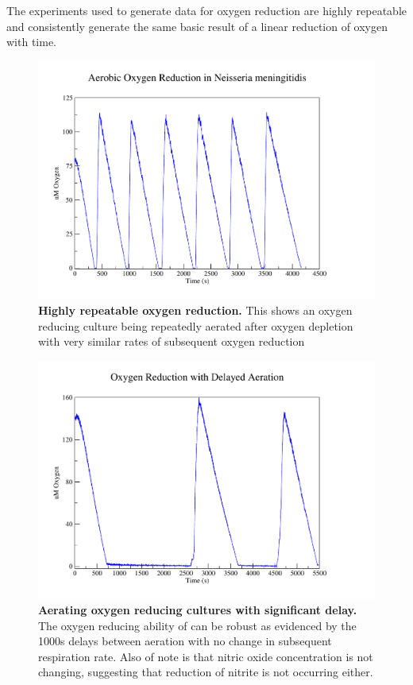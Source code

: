 The experiments used to generate data for oxygen reduction are highly repeatable and consistently generate the same basic result of a linear reduction of oxygen with time.
\begin{figure}[tbp]
 \centering
 \includegraphics[width=14cm, trim=75px 50px 125px 25px]{./05-oxygenreduction/data/repeatable_o2.pdf}
 \caption[Highly repeatable oxygen reduction]{{\bf Highly repeatable oxygen reduction.} This shows an oxygen reducing culture being repeatedly aerated after oxygen depletion with very similar rates of subsequent oxygen reduction
 \label{fig:oxy_repeatable_chl}}
\end{figure}


\begin{figure}[tbp]
 \centering
 \includegraphics[width=14cm, trim=75px 50px 125px 25px]{./05-oxygenreduction/data/o2_delay.pdf}
 \caption[Aerating oxygen reducing cultures with significant delay]{{\bf Aerating oxygen reducing cultures with significant delay.} The oxygen reducing ability of \Nm{} can be robust as evidenced by the 1000s delays between aeration with no change in subsequent respiration rate. Also of note is that nitric oxide concentration is not changing, suggesting that reduction of nitrite is not occurring either.
 \label{fig:repeat_oxy_with_delay}}
\end{figure}

